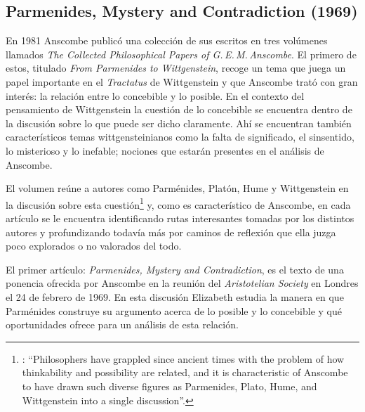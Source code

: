 \subsection{Parmenides, Mystery and Contradiction (1969)}

En 1981 Anscombe publicó una colección de sus escritos en tres volúmenes llamados \emph{The Collected Philosophical Papers of G.\,E.\,M.\,Anscombe}. El primero de estos, titulado \emph{From Parmenides to Wittgenstein}, recoge un tema que juega un papel importante en el \emph{Tractatus} de Wittgenstein y que Anscombe trató con gran interés: la relación entre lo concebible y lo posible. En el contexto del pensamiento de Wittgenstein la cuestión de lo concebible se encuentra dentro de la discusión sobre lo que puede ser dicho claramente. Ahí se encuentran también característicos temas wittgensteinianos como la falta de significado, el sinsentido, lo misterioso y lo inefable; nociones que estarán presentes en el análisis de Anscombe.

El volumen reúne a autores como Parménides, Platón, Hume y Wittgenstein en la discusión sobre esta cuestión\footnote{\cite[Cf.][193]{teichmann2008ans}: \enquote{Philosophers have grappled since ancient times with the problem of how thinkability and possibility are related, and it is characteristic of Anscombe to have drawn such diverse figures as Parmenides, Plato, Hume, and Wittgenstein into a single discussion}.} y, como es característico de Anscombe, en cada artículo se le encuentra identificando rutas interesantes tomadas por los distintos autores y profundizando todavía más por caminos de reflexión que ella juzga poco explorados o no valorados del todo.

El primer artículo: \emph{Parmenides, Mystery and Contradiction}, es el texto de una ponencia ofrecida por Anscombe en la reunión del \emph{Aristotelian Society} en Londres el 24 de febrero de 1969. En esta discusión Elizabeth estudia la manera en que Parménides construye su argumento acerca de lo posible y lo concebible y qué oportunidades ofrece para un análisis de esta relación.

